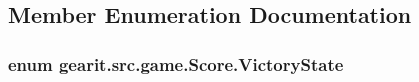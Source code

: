 \subsection{Member Enumeration Documentation}
\hypertarget{classgearit_1_1src_1_1game_1_1_score_a48f48fc89bbc2f4e7009a8a31e0dd700}{
\subsubsection[{Victory\+State}]{\setlength{\rightskip}{0pt plus 5cm}enum {\bf gearit.\+src.\+game.\+Score.\+Victory\+State}}}\label{classgearit_1_1src_1_1game_1_1_score_a48f48fc89bbc2f4e7009a8a31e0dd700}
